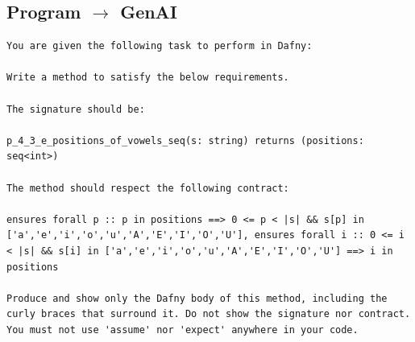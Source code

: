\documentclass{article}
\begin{document}
\subsection*{Program $\rightarrow$ GenAI}
\begin{lstlisting}
You are given the following task to perform in Dafny:

Write a method to satisfy the below requirements.

The signature should be:

p_4_3_e_positions_of_vowels_seq(s: string) returns (positions: seq<int>)

The method should respect the following contract:

ensures forall p :: p in positions ==> 0 <= p < |s| && s[p] in ['a','e','i','o','u','A','E','I','O','U'], ensures forall i :: 0 <= i < |s| && s[i] in ['a','e','i','o','u','A','E','I','O','U'] ==> i in positions

Produce and show only the Dafny body of this method, including the curly braces that surround it. Do not show the signature nor contract. You must not use 'assume' nor 'expect' anywhere in your code.
\end{lstlisting}
\end{document}
